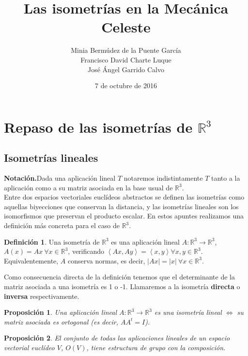 \documentclass[11pt]{article}
\title{Las isometrías en la Mecánica Celeste}
\author{Minia Bermúdez de la Puente García \\ Francisco David Charte Luque \\ José Ángel Garrido Calvo}
\date{7 de octubre de 2016}
\newtheorem{prop}{Proposición}[section]
\theoremstyle{definition}
\newtheorem{mydef}{Definición}[section]
\begin{document}
\maketitle

\vphantom{A}

\tableofcontents
\newpage

\section{Repaso de las isometrías de $\mathbb{R}^3$}
	\subsection{Isometrías lineales}
    
    \noindent\textbf{Notación.}\quad Dada una aplicación lineal $T$ notaremos indistintamente $T$ tanto a la aplicación como a su matriz asociada en la base usual de $\mathbb R^3$.
    \\
    
    Entre dos espacios vectoriales euclídeos abstractos se definen las isometrías como aquellas biyecciones que conservan la distancia, y las isometrías lineales son los isomorfismos que preservan el producto escalar. En estos apuntes realizamos una definición más concreta para el caso de $\mathbb R^3$.
    
    \begin{mydef}
    Una isometría de $\mathbb R^3$ es una aplicación lineal $A:\mathbb R^3\rightarrow \mathbb R^3$, $A(x)=Ax\ \forall x\in \mathbb{R}^3$, verificando $\left<Ax,Ay\right>=\left<x,y\right>\forall x,y\in \mathbb R^3$. Equivalentemente, $A$ conserva normas, es decir, $|Ax|=|x|\ \forall x\in\mathbb R^3$.
    \end{mydef}
    
    Como consecuencia directa de la definición tenemos que el determinante de la matriz asociada a una isometría es 1 o -1. Llamaremos a la isometría \textbf{directa} o \textbf{inversa} respectivamente.
    
	\begin{prop}
    Una aplicación lineal $A:\mathbb R^3\rightarrow\mathbb{R}^3$ es una isometría lineal $\Leftrightarrow$ su matriz asociada es ortogonal (es decir, $AA^t=I$).
    \end{prop}
	\begin{prop}
    El conjunto de todas las aplicaciones lineales de un espacio vectorial euclídeo $V$, $O(V)$, tiene estructura de grupo con la composición.
    \end{prop}
    
\end{document}
